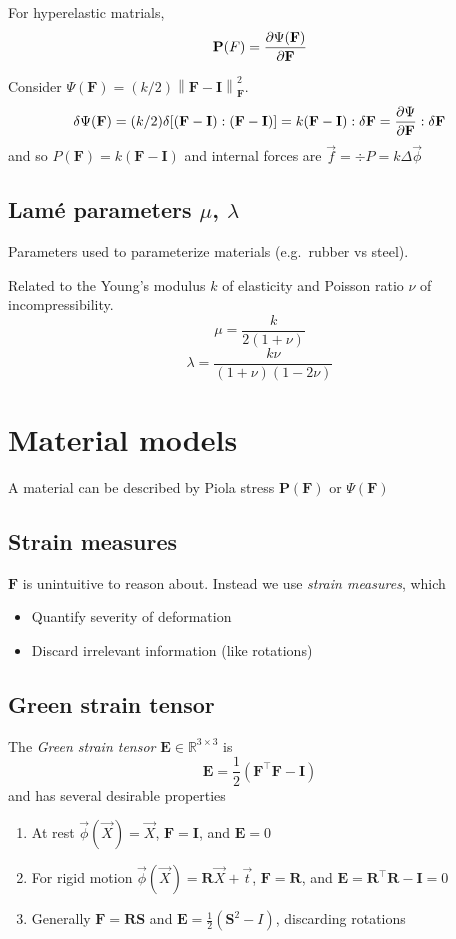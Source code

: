 \documentclass{article}
\newcommand{\Rx}[2]{\ensuremath{\mathbb{R}^{#1 \times #2}}}
\newcommand{\tpose}[1]{\ensuremath{#1^\top}}
\newcommand{\vX}{\ensuremath{\vec{X}}}
\newcommand{\vphi}{\ensuremath{\vec{\phi}}}
\newcommand{\vphiX}{\ensuremath{\vec{\phi}(\vX)}}
\newcommand{\F}{\ensuremath{\mathbf{F}}}
\newcommand{\I}{\ensuremath{\mathbf{I}}}
\newcommand{\PsiF}{\ensuremath{\Psi(\F)}}
\newcommand{\vf}{\ensuremath{\vec{f}}}
\renewcommand{\P}{\ensuremath{\mathbf{P}}}
\newcommand{\PF}{\ensuremath{\P(\F)}}
\newcommand{\E}{\ensuremath{\mathbf{E}}}
\newcommand{\GreenDefn}{\ensuremath{\E = \frac{1}{2}(\tpose{\F}\F - \I)}}
\begin{document}
\pagebreak
For hyperelastic matrials, $$\P(F) = \pdv{\PsiF}{\F}$$

\begin{tcolorbox}[title=Example]
  Consider $\PsiF = (k/2) \left\| \F - \I \right\|^2_{\F}$.
  $$\delta \PsiF = (k/2)\delta[(\F-\I):(\F-\I)] = k(\F-\I):\delta\F = \pdv{\Psi}{\F}:\delta\F$$
  and so
  $P(\F) = k(\F-\I)$
  and internal forces are $\vf = \div P = k\Delta\vphi$
\end{tcolorbox}

\pagebreak
\subsection{Lam\'e parameters $\mu$, $\lambda$}
Parameters used to parameterize materials (e.g.\ rubber vs steel).

Related to the Young's modulus $k$ of elasticity and Poisson ratio $\nu$ of
incompressibility.
$$\mu = \frac{k}{2(1 + \nu)}$$
$$\lambda = \frac{k\nu}{(1 + \nu)(1 - 2\nu)}$$

\pagebreak
\section{Material models}
A material can be described by Piola stress $\PF$ or $\PsiF$

\subsection{Strain measures}
$\F$ is unintuitive to reason about. Instead we use \emph{strain measures},
which

\begin{itemize}
  \item Quantify severity of deformation
  \item Discard irrelevant information (like rotations)
\end{itemize}

\pagebreak
\subsection{Green strain tensor}
The \emph{Green strain tensor} $\E \in \Rx{3}{3}$ is
$$\GreenDefn$$
and has several desirable properties
\begin{enumerate}
  \item At rest $\vphiX = \vX$, $\F = \I$, and $\E = 0$
  \item For rigid motion $\vphiX = \mathbf{R}\vX + \vec{t}$, $\F = \mathbf{R}$, and $\E = \tpose{\mathbf{R}}\mathbf{R} - \I = 0$
  \item Generally $\F = \mathbf{R}\mathbf{S}$ and $\E = \frac{1}{2}(\mathbf{S}^2 - I)$, discarding rotations
\end{enumerate}
\end{document}
